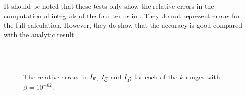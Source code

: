 It should be noted that these tests only show the relative errors in the
computation of integrals of the four terms in . They
do not represent
errors for the full calculation. However, they do show that the accuracy is good
compared with the analytic result. 

\begin{figure}[htbp]
\centering%
\\%
\\%
%
\caption[Relative Errors in $I_\B$, $I_{\wt{\C}}$ and $I_{\wt{\D}}$]{The relative
errors in $I_\B$,
$I_{\wt{\C}}$ and $I_{\wt{\D}}$ for each of the $k$ ranges with $\beta=10^{-62}$.}
\label{fig:rel-bcd-num}
\end{figure}


